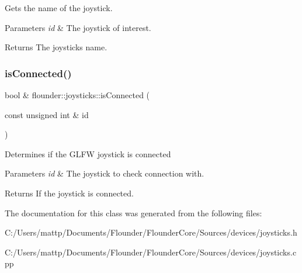 Gets the name of the joystick. 


\begin{DoxyParams}{Parameters}
{\em id} & The joystick of interest. \\
\hline
\end{DoxyParams}
\begin{DoxyReturn}{Returns}
The joysticks name. 
\end{DoxyReturn}
\mbox{\label{classflounder_1_1joysticks_ad6309541a3d177f9d37c941f8cc09c62}} 
\subsubsection{\texorpdfstring{is\+Connected()}{isConnected()}}
{\footnotesize\ttfamily bool \& flounder\+::joysticks\+::is\+Connected (\begin{DoxyParamCaption}\item[{const unsigned int \&}]{id }\end{DoxyParamCaption})}



Determines if the G\+L\+FW joystick is connected 


\begin{DoxyParams}{Parameters}
{\em id} & The joystick to check connection with. \\
\hline
\end{DoxyParams}
\begin{DoxyReturn}{Returns}
If the joystick is connected. 
\end{DoxyReturn}


The documentation for this class was generated from the following files\+:\begin{DoxyCompactItemize}
\item 
C\+:/\+Users/mattp/\+Documents/\+Flounder/\+Flounder\+Core/\+Sources/devices/joysticks.\+h\item 
C\+:/\+Users/mattp/\+Documents/\+Flounder/\+Flounder\+Core/\+Sources/devices/joysticks.\+cpp\end{DoxyCompactItemize}
